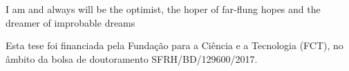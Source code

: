 
{
	I am and always will be the optimist, the hoper of far-flung hopes and the
	dreamer of \newline improbable dreams
}

\begin{acknowledgements}

Esta tese foi financiada pela Fundação para a Ciência e a Tecnologia (FCT), no âmbito da bolsa de doutoramento SFRH/BD/129600/2017.

\end{acknowledgements}

\addvspacetoc{0.3cm} %


